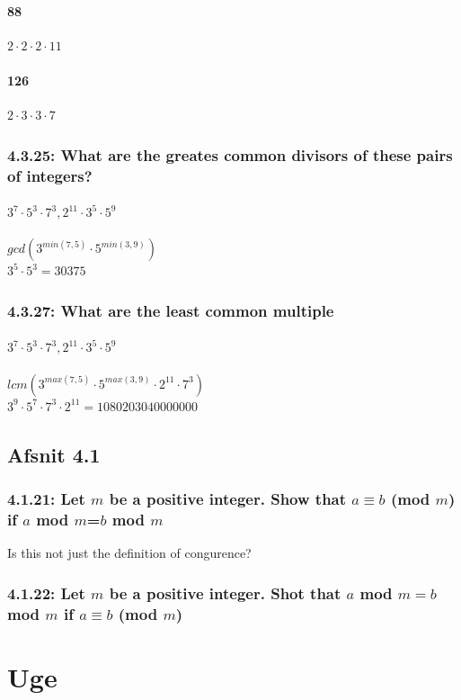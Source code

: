 \documentclass[12pt, a4paper]{report}
\begin{document}
					\subsubsection{88}
						$2\cdot 2\cdot 2\cdot 11$
					\subsubsection{126}
						$2\cdot 3\cdot 3\cdot 7$
				\setcounter{subsection}{24}
				\subsection{4.3.25: What are the greates common divisors of these pairs of integers?}
					\subsubsection{$3^7\cdot 5^3\cdot 7^3, 2^{11}\cdot 3^5\cdot 5^9$}
					$gcd(3^{min(7,5)}\cdot 5^{min(3,9)})$\\
					$3^5\cdot 5^3=30375$
				\setcounter{subsection}{26}
				\subsection{4.3.27: What are the least common multiple}
					\subsubsection{$3^7\cdot 5^3\cdot 7^3, 2^{11}\cdot 3^5\cdot 5^9$}
					$lcm(3^{max(7,5)}\cdot 5^{max(3,9)}\cdot 2^{11}\cdot7^3)$\\
					$3^9\cdot 5^7\cdot 7^3\cdot 2^{11}=1080203040000000$
			\section{Afsnit 4.1}
				\setcounter{subsection}{20}
				\subsection{4.1.21: Let $m$ be a positive integer. Show that $a\equiv b$ (mod $m$) if $a$ mod $m$=$b$ mod $m$}
					Is this not just the definition of congurence?
				\subsection{4.1.22: Let $m$ be a positive integer. Shot that $a$ mod $m=b$ mod $m$ if $a\equiv b$ (mod $m$)}
		\chapter{Uge}
\end{document}
